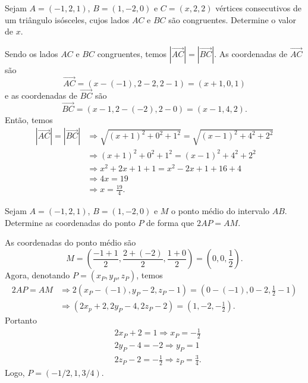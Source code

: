 \begin{exeresol}
  Sejam $A = (-1,2,1)$, $B = (1,-2,0)$ e $C = (x,2,2)$ vértices consecutivos de um triângulo isósceles, cujos lados $AC$ e $BC$ são congruentes. Determine o valor de $x$.
\end{exeresol}
\begin{resol}
  Sendo os lados $AC$ e $BC$ congruentes, temos $|\overrightarrow{AC}| = |\overrightarrow{BC}|$. As coordenadas de $\overrightarrow{AC}$ são
  \begin{equation}
    \overrightarrow{AC} = (x-(-1),2-2,2-1) = (x+1,0,1)
  \end{equation}
  e as coordenadas de $\overrightarrow{BC}$ são
  \begin{equation}
    \overrightarrow{BC} = (x-1,2-(-2),2-0) = (x-1,4,2).
  \end{equation}
  Então, temos
  \begin{align}
    |\overrightarrow{AC}| = |\overrightarrow{BC}| &\Rightarrow \sqrt{(x+1)^2+0^2+1^2} = \sqrt{(x-1)^2+4^2+2^2}\\
                                                  &\Rightarrow (x+1)^2+0^2+1^2 = (x-1)^2+4^2+2^2\\
                                                  &\Rightarrow x^2+2x+1+1 = x^2-2x+1+16+4\\
                                                  &\Rightarrow 4x = 19\\
                                                  &\Rightarrow x = \frac{19}{4}.
  \end{align}
\end{resol}

\begin{exeresol}
  Sejam $A = (-1,2,1)$, $B = (1,-2,0)$  e $M$ o ponto médio do intervalo $AB$. Determine as coordenadas do ponto $P$ de forma que $2AP = AM$.
\end{exeresol}
\begin{resol}
  As coordenadas do ponto médio são
  \begin{equation}
    M = \left(\frac{-1+1}{2},\frac{2+(-2)}{2},\frac{1+0}{2}\right) = \left(0,0,\frac{1}{2}\right).
  \end{equation}
  Agora, denotando $P = (x_P,y_P,z_P)$, temos
  \begin{align}
    2AP = AM &\Rightarrow 2(x_P-(-1),y_P-2,z_P-1) = \left(0-(-1),0-2,\frac{1}{2}-1\right)\\
             &\Rightarrow (2x_p+2,2y_P-4,2z_P-2) = \left(1,-2,-\frac{1}{2}\right).
  \end{align}
  Portanto
  \begin{align}
    & 2x_P+2 = 1 \Rightarrow x_P = -\frac{1}{2}\\
    & 2y_P-4 = -2 \Rightarrow y_P = 1\\
    & 2z_P-2 = -\frac{1}{2} \Rightarrow z_P = \frac{3}{4}.
  \end{align}
  Logo, $P = (-1/2,1,3/4)$.
\end{resol}

